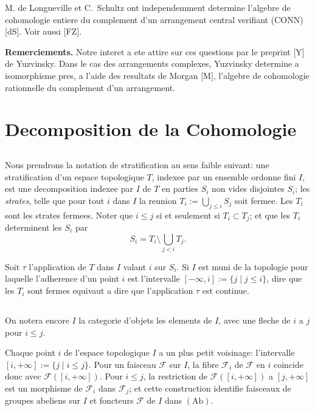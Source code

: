 \documentclass[11pt,a4paper]{article}
\theoremstyle{plain}
\theoremstyle{definition}
\begin{document}
M. de Longueville et C.~Schultz ont independemment determine l'algebre de cohomologie entiere du complement d'un arrangement central verifiant (CONN) [dS]. Voir aussi [FZ].

\textbf{Remerciements.} Notre interet a ete attire sur ces questions par le preprint [Y] de Yuzvinsky. Dans le cas des arrangements complexes, Yuzvinsky determine a isomorphisme pres, a l'aide des resultats de Morgan [M], l'algebre de cohomologie rationnelle du complement d'un arrangement.

\section{Decomposition de la Cohomologie}

\subsection{}

Nous prendrons la notation de stratification au sens faible suivant: une stratification d'un espace topologique $T$, indexee par un ensemble ordonne fini $I$, est une decomposition indexee par $I$ de $T$ en parties $S_i$ non vides disjointes $S_i$; les \emph{strates}, telle que pour tout $i$ dans $I$ la reunion $T_i := \bigcup_{j \leq i} S_j$ soit fermee. Les $T_i$ sont les strates fermees. Noter que $i \leq j$ si et seulement si $T_i \subset T_j$; et que les $T_i$ determinent les $S_i$ par
\begin{equation}\label{eq:1.1.1}
S_i = T_i \setminus \bigcup_{j<i} T_j.
\tag{1.1.1}
\end{equation}

Soit $\tau$ l'application de $T$ dans $I$ valant $i$ sur $S_i$. Si $I$ est muni de la topologie pour laquelle l'adherence d'un point $i$ est l'intervalle $[-\infty,i] := \{j \mid j \leq i\}$, dire que les $T_i$ sont fermes equivaut a dire que l'application $\tau$ est continue.

\subsection{}

On notera encore $I$ la categorie d'objets les elements de $I$, avec une fleche de $i$ a $j$ pour $i \leq j$.

Chaque point $i$ de l'espace topologique $I$ a un plus petit voisinage: l'intervalle $[i,+\infty] := \{j \mid i \leq j\}$. Pour un faisceau $\mathcal{F}$ sur $I$, la fibre $\mathcal{F}_i$ de $\mathcal{F}$ en $i$ coincide donc avec $\mathcal{F}([i,+\infty])$. Pour $i \leq j$, la restriction de $\mathcal{F}([i,+\infty])$ a $[j,+\infty]$ est un morphisme de $\mathcal{F}_i$ dans $\mathcal{F}_j$; et cette construction identifie faisceaux de groupes abeliens sur $I$ et foncteurs $\mathcal{F}$ de $I$ dans $(\mathrm{Ab})$.
\end{document}
